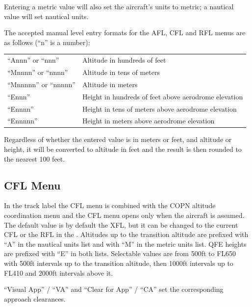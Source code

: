 \documentclass[a4paper,oneside,11pt]{memoir}
\newcommand{\winref}[1]{\textit{\titleref{#1}}}
\newcommand\capdimage[2]{
\begin{center}
\hspace{1em}%
\vtop{%
\centering
\texttt{[image: \#1]}%
\captionof{figure}{#2}%
}%
\end{center}
\ignorespaces}
\begin{document}
\bigskip

Entering a metric value will also set the aircraft’s units to metric; a nautical value will set nautical units.

\bigskip

The accepted manual level entry formats for the AFL, CFL and RFL menus are as follows (“n” is a number):

\bigskip

\begin{longtable}{p{5cm} p{7.5cm}}
“Annn” or “nnn”         & Altitude in hundreds of feet\\
“Mnnnn” or “nnnn”       & Altitude in tens of meters\\
“Mnnnnn” or “nnnnn”     & Altitude in meters\\
“Ennn”                  & Height in hundreds of feet above aerodrome elevation\\
“Ennnn”                 & Height in tens of meters above aerodrome elevation\\
“Ennnnn”                & Height in meters above aerodrome elevation\\
\end{longtable}    

\bigskip

Regardless of whether the entered value is in meters or feet, and altitude or height, it will be converted to altitude in feet and the result is then rounded to the nearest 100 feet.

\subsection{CFL Menu}
\label{menu:cfl}
\capdimage{img/cfl.png}{CFL Menu}

In the track label the CFL menu is combined with the COPN altitude coordination menu and the CFL menu opens only when the aircraft is assumed. The default value is by default the XFL, but it can be changed to the current CFL or the RFL in the \winref{menu:localset}. Altitudes up to the transition altitude are prefixed with “A” in the nautical units list and with “M” in the metric units list. QFE heights are prefixed with “E” in both lists. Selectable values are from 500ft to FL650 with 500ft intervals up to the transition altitude, then 1000ft intervals up to FL410 and 2000ft intervals above it. 

\bigskip

“Visual App” / “VA” and “Clear for App” / “CA” set the corresponding approach clearances.
\end{document}
